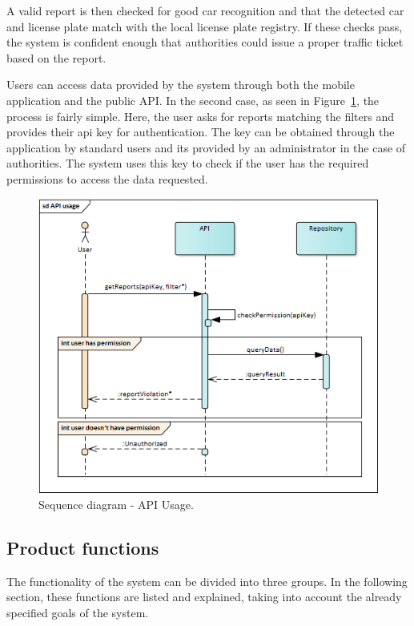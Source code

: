 A valid report is then checked for good car recognition and that the detected car and license plate match with the local license plate registry. If these checks pass, the system is confident enough that authorities could issue a proper traffic ticket based on the report.

Users can access data provided by the system through both the mobile application and the public API. In the second case, as seen in Figure~\ref{fig:api-usage}, the process is fairly simple. Here, the user asks for reports matching the filters and provides their api key for authentication. The key can be obtained through the application by standard users and its provided by an administrator in the case of authorities. The system uses this key to check if the user has the required permissions to access the data requested.

\begin{figure}[!h]
\centering
\includegraphics[width=\textwidth]{Images/api-usage.png}
\caption{\label{fig:api-usage}Sequence diagram - API Usage.}
\end{figure}

\subsection{Product functions}
The functionality of the system can be divided into three groups. In the following section, these functions are listed and explained, taking into account the already specified goals of the system.

